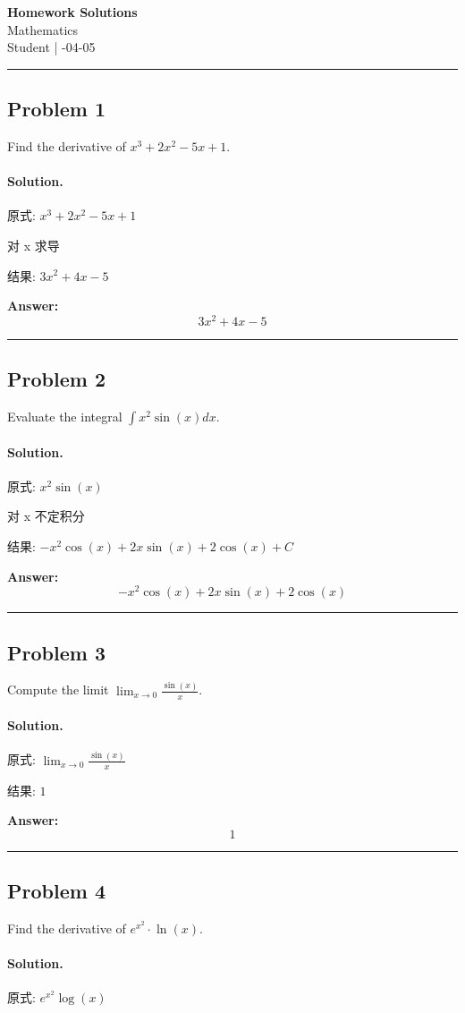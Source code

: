 \documentclass[12pt, a4paper]{article}
\newcommand{\problem}[1]{\subsection*{Problem #1}}
\newcommand{\solution}{\paragraph{Solution.}}
\begin{document}
\begin{center}
    {\LARGE\bfseries Homework Solutions} \\[0.5em]
    {\large Mathematics} \\[0.3em]
    Student \quad | -04-05
\end{center}

\hrule
\vspace{1em}
\problem{1}

Find the derivative of $x^3 + 2x^2 - 5x + 1$.

\solution

原式: $x^{3} + 2 x^{2} - 5 x + 1$

对 x 求导

结果: $3 x^{2} + 4 x - 5$

\textbf{Answer:}
\[\boxed{3 x^{2} + 4 x - 5}\]

\vspace{1em}
\hrule
\vspace{1em}

\problem{2}

Evaluate the integral $\int x^2 \sin(x) dx$.

\solution

原式: $x^{2} \sin{\left(x \right)}$

对 x 不定积分

结果: $- x^{2} \cos{\left(x \right)} + 2 x \sin{\left(x \right)} + 2 \cos{\left(x \right)} + C$

\textbf{Answer:}
\[\boxed{- x^{2} \cos{\left(x \right)} + 2 x \sin{\left(x \right)} + 2 \cos{\left(x \right)}}\]

\vspace{1em}
\hrule
\vspace{1em}

\problem{3}

Compute the limit $\lim_{x \to 0} \frac{\sin(x)}{x}$.

\solution

原式: $\lim_{x \to 0} \frac{\sin{\left(x \right)}}{x}$

结果: $1$

\textbf{Answer:}
\[\boxed{1}\]

\vspace{1em}
\hrule
\vspace{1em}

\problem{4}

Find the derivative of $e^{x^2} \cdot \ln(x)$.

\solution

原式: $e^{x^{2}} \log{\left(x \right)}$
\end{document}
